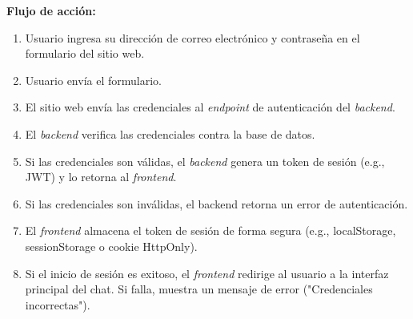 \begin{addendum}
\begin{userstory}[hu:02]
{			\textbf{Flujo de acción:}
			\begin{enumerate}
				\item Usuario ingresa su dirección de correo electrónico y contraseña en el formulario del sitio web.
				\item Usuario envía el formulario.
				\item El sitio web envía las credenciales al \textit{endpoint} de autenticación del \textit{backend}.
				\item El \textit{backend} verifica las credenciales contra la base de datos.
				\item Si las credenciales son válidas, el \textit{backend} genera un token de sesión (e.g., JWT) y lo retorna al \textit{frontend}.
				\item Si las credenciales son inválidas, el backend retorna un error de autenticación.
				\item El \textit{frontend} almacena el token de sesión de forma segura (e.g., localStorage, sessionStorage o cookie HttpOnly).
				\item Si el inicio de sesión es exitoso, el \textit{frontend} redirige al usuario a la interfaz principal del chat. Si falla, muestra un mensaje de error ("Credenciales incorrectas").
			\end{enumerate}
		}
		

\end{userstory}
\end{addendum}
